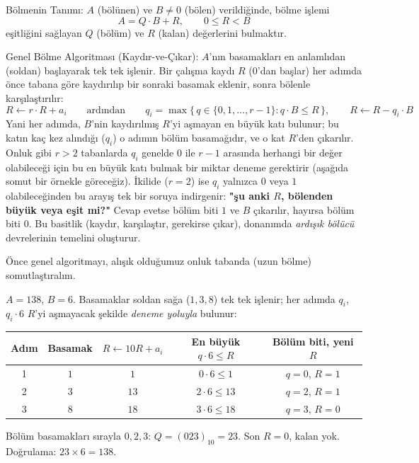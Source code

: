\begin{tanim}{Bölmenin Tanımı:}
$A$ (bölünen) ve $B\neq0$ (bölen) verildiğinde, bölme işlemi
\[
A = Q\cdot B + R, \qquad 0 \le R < B
\]
eşitliğini sağlayan $Q$ (bölüm) ve $R$ (kalan) değerlerini bulmaktır.
\end{tanim}

\begin{tanim}{Genel Bölme Algoritması (Kaydır-ve-Çıkar):}
$A$'nın basamakları en anlamlıdan (soldan) başlayarak tek tek işlenir. Bir çalışma kaydı
$R$ ($0$'dan başlar) her adımda önce tabana göre kaydırılıp bir sonraki basamak eklenir,
sonra bölenle karşılaştırılır:
\[
R \leftarrow r\cdot R + a_i \qquad\text{ardından}\qquad
q_i = \max\{\,q \in \{0,1,\ldots,r{-}1\} : q\cdot B \le R\,\}, \qquad R \leftarrow R - q_i\cdot B
\]
Yani her adımda, $B$'nin kaydırılmış $R$'yi aşmayan en büyük katı bulunur; bu katın kaç
kez alındığı ($q_i$) o adımın bölüm basamağıdır, ve o kat $R$'den çıkarılır. Onluk gibi
$r>2$ tabanlarda $q_i$ genelde $0$ ile $r{-}1$ arasında herhangi bir değer olabileceği için
bu en büyük katı bulmak bir miktar deneme gerektirir (aşağıda somut bir örnekle göreceğiz).
İkilide ($r{=}2$) ise $q_i$ yalnızca $0$ veya $1$ olabileceğinden bu arayış tek bir soruya
indirgenir: \textbf{"şu anki $R$, bölenden büyük veya eşit mi?"} Cevap evetse bölüm biti
$1$ ve $B$ çıkarılır, hayırsa bölüm biti $0$. Bu basitlik (kaydır, karşılaştır, gerekirse
çıkar), donanımda \emph{ardışık bölücü} devrelerinin temelini oluşturur.
\end{tanim}

Önce genel algoritmayı, alışık olduğumuz onluk tabanda (uzun bölme) somutlaştıralım.

\begin{ornek}
$A=138$, $B=6$. Basamaklar soldan sağa ($1,3,8$) tek tek işlenir; her adımda $q_i$, $q_i\cdot6$
$R$'yi aşmayacak şekilde \emph{deneme yoluyla} bulunur:
\begin{center}
\begin{tabular}{ccccc}
\toprule
Adım & Basamak & $R\leftarrow10R+a_i$ & En büyük $q\cdot6\le R$ & Bölüm biti, yeni $R$ \\
\midrule
1 & $1$ & $1$ & $0\cdot6\le1$ & $q{=}0$, $R{=}1$ \\
2 & $3$ & $13$ & $2\cdot6\le13$ & $q{=}2$, $R{=}1$ \\
3 & $8$ & $18$ & $3\cdot6\le18$ & $q{=}3$, $R{=}0$ \\
\bottomrule
\end{tabular}
\end{center}
Bölüm basamakları sırayla $0,2,3$: $Q=(023)_{10}=23$. Son $R=0$, kalan yok. Doğrulama:
$23\times6=138$. \checkmark
\end{ornek}

